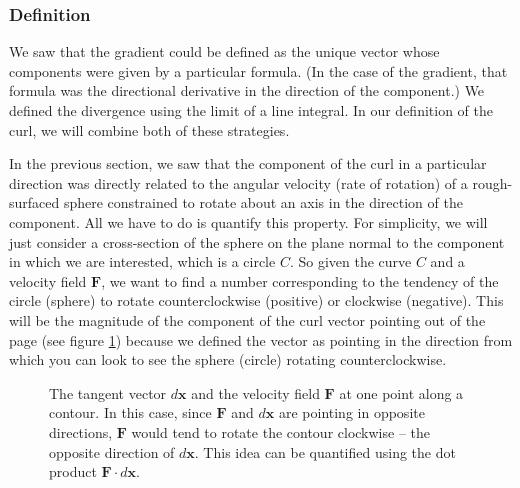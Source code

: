\documentclass{myarticle}
\renewcommand{\vec}[1]{\mathbf{#1}}
\theoremstyle{nospace}
\newtheorem{old series theorem}{Theorem}
\newenvironment{series theorem}{\begin{mdframed}\begin{old series theorem}}{\end{old series theorem}\end{mdframed}}
\begin{document}
\subsubsection{Definition} \label{sec:curl definition}

We saw that the gradient could be defined as the unique vector whose components were given by a particular formula. (In the case of the gradient, that formula was the directional derivative in the direction of the component.) We defined the divergence using the limit of a line integral. In our definition of the curl, we will combine both of these strategies.

In the previous section, we saw that the component of the curl in a particular direction was directly related to the angular velocity (rate of rotation) of a rough-surfaced sphere constrained to rotate about an axis in the direction of the component. All we have to do is quantify this property. For simplicity, we will just consider a cross-section of the sphere on the plane normal to the component in which we are interested, which is a circle $C$. So given the curve $C$ and a velocity field $\vec{F}$, we want to find a number corresponding to the tendency of the circle (sphere) to rotate counterclockwise (positive) or clockwise (negative). This will be the magnitude of the component of the curl vector pointing out of the page (see figure \ref{fig:curl circle}) because we defined the vector as pointing in the direction from which you can look to see the sphere (circle) rotating counterclockwise.

\begin{figure}[htb!] \centering
{}
\caption{The tangent vector $d\vec{x}$ and the velocity field $\vec{F}$ at one point along a contour. In this case, since $\vec{F}$ and $d\vec{x}$ are pointing in opposite directions, $\vec{F}$ would tend to rotate the contour clockwise -- the opposite direction of $d\vec{x}$. This idea can be quantified using the dot product $\vec{F} \cdot d\vec{x}$.}
\label{fig:curl circle}
\end{figure}
\end{document}
